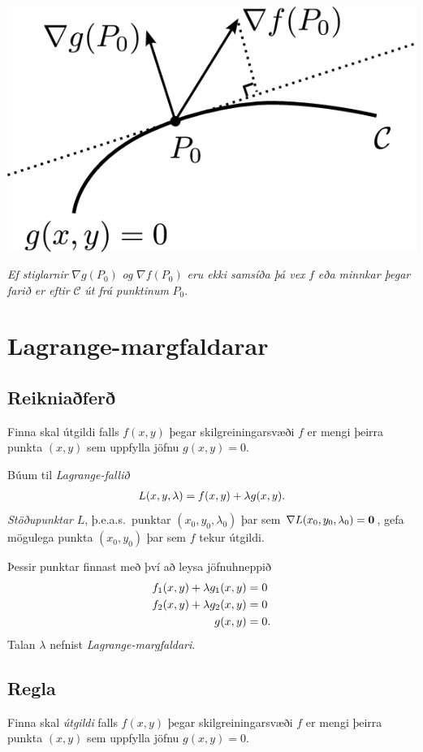 \documentclass[a4paper,10pt,icelandic]{sphinxmanual}
\begin{document}
{\hfill\includegraphics[width=0.400\linewidth]{lagrange1.png}\hfill}

\emph{Ef stiglarnir} \(\nabla g(P_0)\) \emph{og} \(\nabla f(P_0)\) \emph{eru ekki
samsíða þá vex} \(f\) \emph{eða minnkar þegar farið er eftir}
\(\mathcal{C}\) \emph{út frá punktinum} \(P_0\).


\section{Lagrange-margfaldarar}
\label{Kafli3:index-5}\label{Kafli3:lagrange-margfaldarar}

\subsection{Reikniaðferð}
\label{Kafli3:reikniafer}
Finna skal útgildi falls \(f(x,y)\) þegar skilgreiningarsvæði
\(f\) er mengi þeirra punkta \((x,y)\) sem uppfylla jöfnu
\(g(x,y)=0\).

Búum til \emph{Lagrange-fallið}
\begin{gather}
\begin{split}L(x,y,\lambda)=f(x,y)+\lambda g(x,y).\end{split}\notag
\end{gather}
\textit{Stöðupunktar} \(L\), þ.e.a.s. punktar \((x_0,y_0,\lambda_0)\) þar
sem \(\nabla L(x_0,y_0,\lambda_0)=\mbox{${\bf 0}$}\), gefa mögulega
punkta \((x_0,y_0)\) þar sem \(f\) tekur útgildi.

Þessir punktar finnast með því að leysa jöfnuhneppið
\begin{gather}
\begin{split}\begin{aligned}
f_1(x,y)+\lambda g_1(x,y)&=0\\
f_2(x,y)+\lambda g_2(x,y)&=0\\
g(x,y)&=0.\end{aligned}\end{split}\notag
\end{gather}
Talan \(\lambda\) nefnist \emph{Lagrange-margfaldari}.


\subsection{Regla}
\label{Kafli3:id13}
Finna skal \textit{útgildi} falls \(f(x,y)\) þegar skilgreiningarsvæði
\(f\) er mengi þeirra punkta \((x,y)\) sem uppfylla jöfnu
\(g(x,y)=0\).
\end{document}
